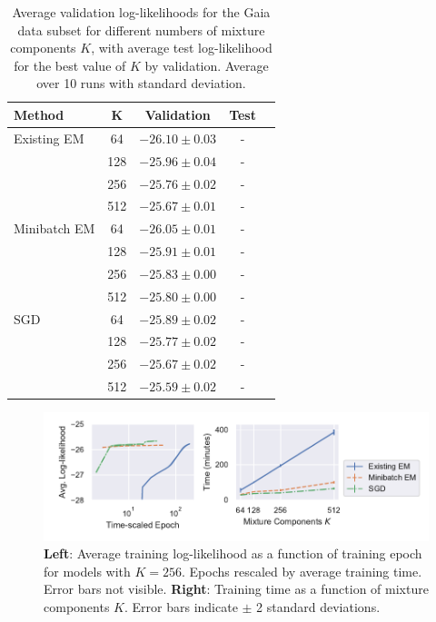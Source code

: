 \documentclass{article}
\begin{document}
\begin{table}{}
  \caption{Average validation log-likelihoods for the Gaia data subset for different numbers of mixture components $K$, with average test log-likelihood for the best value of $K$ by validation. Average over 10 runs with standard deviation.}
  \label{results-table}
  \centering
  \begin{tabular}{lcccc}
      \toprule
      Method     & K &  Validation     & Test\\
      \midrule
      Existing EM & 64 & $-26.10 \pm 0.03$ & - \\
      \citet{bovyExtremeDeconvolutionInferring2011} & 128 & $-25.96 \pm 0.04$ & - \\
       & 256 & $-25.76 \pm 0.02$ & - \\
       & 512 & $-25.67 \pm 0.01$ & - \\
      \midrule
      Minibatch EM & 64 & $-26.05 \pm 0.01$ & - \\
       & 128 & $-25.91 \pm 0.01$ & - \\
       & 256 & $-25.83 \pm 0.00$ & - \\
       & 512 & $-25.80 \pm 0.00$ & - \\
      \midrule
      SGD & 64 & $-25.89 \pm 0.02$ & - \\
       & 128 & $-25.77 \pm 0.02$ & - \\
       & 256 & $-25.67 \pm 0.02$ & - \\
       & 512 & $-25.59 \pm 0.02$ & - \\
      \bottomrule
  \end{tabular}
\end{table}

\begin{figure}
  \centering
  \includegraphics[width=\textwidth]{figures/learning.pdf}
  \caption{\textbf{Left}: Average training log-likelihood as a function of training epoch for models with $K=256$. Epochs rescaled by average training time. Error bars not visible. \textbf{Right}: Training time as a function of mixture components $K$. Error bars indicate $\pm$ 2 standard deviations.}
  \label{fig:training}
\end{figure}
\end{document}
